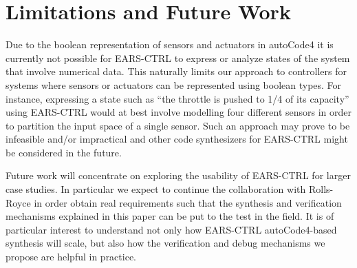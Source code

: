 \section{Limitations and Future Work}
\label{sec:limfuturework}
Due to the boolean representation of sensors and actuators in
\textsf{autoCode4} it is currently not possible for \textsf{EARS-CTRL} to express or analyze
states of the system that involve numerical data. This naturally limits our
approach to controllers for systems where sensors or actuators can be
represented using boolean types.
For instance, expressing a state such as ``the throttle is pushed to 1/4 of its
capacity'' using \textsf{EARS-CTRL} would at best involve modelling four
different sensors in order to partition the input space of a single sensor. Such
an approach may prove to be infeasible and/or impractical and other code
synthesizers for \textsf{EARS-CTRL} might be considered in the future.

Future work will concentrate on exploring the usability of
\textsf{EARS-CTRL} for larger case studies. In particular we expect to continue
the collaboration with Rolls-Royce in order obtain real requirements such that
the synthesis and verification mechanisms explained in this paper can be put to
the test in the field. It is of particular interest to understand not only how
\textsf{EARS-CTRL} \textsf{autoCode4}-based synthesis will scale, but also how
the verification and debug mechanisms we propose are helpful in practice.

